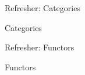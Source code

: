   


\begin{frame}[t]{Refresher: Categories} %

  \par{} Categories
  \vspace{5\baselineskip}
  \par{}
  
\end{frame}

\begin{frame}[t]{Refresher: Functors} %

  \par{} Functors
  \vspace{5\baselineskip}
  \par{}
  
\end{frame}
